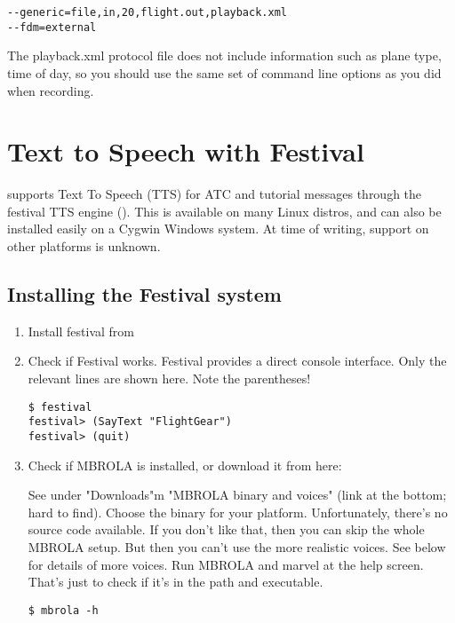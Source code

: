 \begin{verbatim}
--generic=file,in,20,flight.out,playback.xml
--fdm=external
\end{verbatim}

The playback.xml protocol file does not include information such as plane type,
time of day, so you should use the same set of command line options as you
did when recording.

\section{Text to Speech with Festival}

\FlightGear{} supports Text To Speech (TTS) for ATC and tutorial messages through the festival TTS
engine (). This is available on many Linux distros,
and can also be installed easily on a Cygwin
Windows system. At time of writing, support on other platforms is unknown.

\subsection{Installing the Festival system}

\begin{enumerate}
\item Install festival from 

\item Check if Festival works. Festival provides a direct console interface. Only the relevant lines are 
shown here. Note the parentheses!

\begin{verbatim}
$ festival
festival> (SayText "FlightGear")
festival> (quit)
\end{verbatim}

\item Check if MBROLA is installed, or download it from here: 


See under "Downloads"m "MBROLA binary and voices" 
(link at the bottom; hard to find). Choose the binary for your platform. Unfortunately, there's no 
source code available. If you don't like that, then you can skip the whole MBROLA setup. 
But then you can't use the more realistic voices. See below for details of more voices.
Run MBROLA and marvel at the help screen. That's just to check if it's in the path and executable.

\begin{verbatim}
$ mbrola -h
\end{verbatim}
\end{enumerate}

